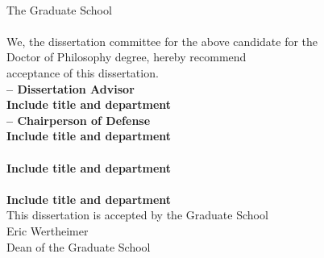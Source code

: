 \documentclass[
12pt, %
oneside, %
english, %
singlespacing, %
liststotoc, %
]{main} %
\begin{document}
\setcounter{page}{2}
\begin{center}
	\textbf{\univname}\\[0.5cm]
	The Graduate School\\[2cm]
	\textbf{\authorname}\\[2cm]
	We, the dissertation committee for the above candidate for the \\[0.5cm]
	Doctor of Philosophy degree, hereby recommend \\[0.5cm]
	acceptance of this dissertation. \\[1cm]
	
	\textbf{{\supname} -- Dissertation Advisor\\
	Include title and department}\\ [1cm]
	
	\textbf{{\examinerOname} -- Chairperson of Defense\\
	Include title and department}\\ [1cm]
	
	\textbf{{\examinerThname}\\
	Include title and department}\\ [1cm]
	
	\textbf{{\examinerJrname}\\
	Include title and department}\\ [1cm]
	
	This dissertation is accepted by the Graduate School\\ [2cm]
	Eric Wertheimer\\ [0.5cm]
	Dean of the Graduate School\\ [0.5cm]
	
%
%
\end{center}


\end{document}
